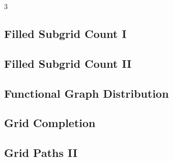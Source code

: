 \documentclass[8pt]{extarticle}
\begin{document}
\begin{multicols*}{3}
\subsection{Filled Subgrid Count I}
\begin{caixaenunciado}

\end{caixaenunciado}
\vspace{0.3cm}


\subsection{Filled Subgrid Count II}
\begin{caixaenunciado}

\end{caixaenunciado}
\vspace{0.3cm}


\subsection{Functional Graph Distribution}
\begin{caixaenunciado}

\end{caixaenunciado}
\vspace{0.3cm}


\subsection{Grid Completion}
\begin{caixaenunciado}

\end{caixaenunciado}
\vspace{0.3cm}


\subsection{Grid Paths II}
\begin{caixaenunciado}

\end{caixaenunciado}
\vspace{0.3cm}



\end{multicols*}
\end{document}
